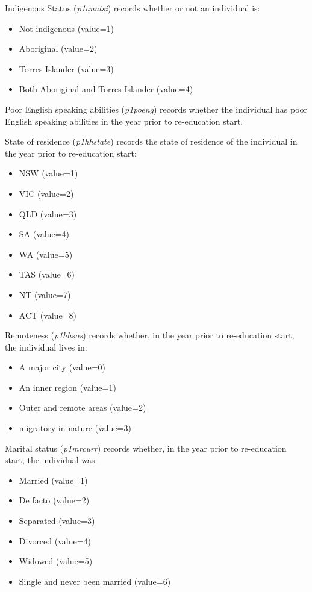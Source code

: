 \documentclass[12pt, a4paper]{article}
\begin{document}
Indigenous Status (\textit{p1\textunderscore{}anatsi}) records whether or not an individual is:
\begin{itemize}
  \item Not indigenous (value=1)
  \item Aboriginal (value=2)
  \item Torres Islander (value=3)
  \item Both Aboriginal and Torres Islander (value=4) 
\end{itemize}  

Poor English speaking abilities (\textit{p1\textunderscore{}poeng}) records whether the individual has poor English speaking abilities in the year prior to re-education start. 

State of residence (\textit{p1\textunderscore{}hhstate}) records the state of residence of the individual in the year prior to re-education start:
\begin{itemize}
  \item NSW (value=1)
  \item VIC (value=2)
  \item QLD (value=3)
  \item SA (value=4)
  \item WA (value=5)
  \item TAS (value=6)
  \item NT (value=7)
  \item ACT (value=8) 
\end{itemize}  

Remoteness (\textit{p1\textunderscore{}hhsos}) records whether, in the year prior to re-education start, the individual lives in:
\begin{itemize}
  \item A major city (value=0)
  \item An inner region (value=1)
  \item Outer and remote areas (value=2) 
  \item migratory in nature (value=3)
\end{itemize}  

Marital status (\textit{p1\textunderscore{}mrcurr}) records whether, in the year prior to re-education start, the individual was:
\begin{itemize}
  \item Married (value=1)
  \item De facto (value=2)
  \item Separated (value=3)
  \item Divorced (value=4)
  \item Widowed (value=5)
  \item Single and never been married (value=6)
\end{itemize}  
\end{document}
